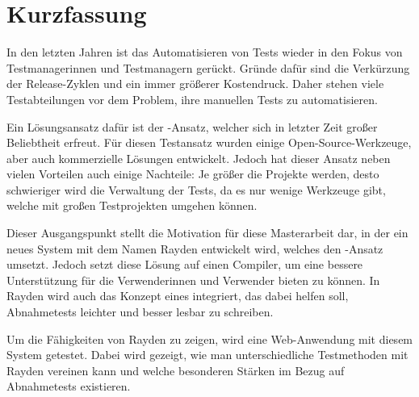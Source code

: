 \chapter{Kurzfassung}

In den letzten Jahren ist das Automatisieren von Tests wieder in den Fokus von Testmanagerinnen und Testmanagern gerückt. Gründe dafür sind die Verkürzung der Release-Zyklen und ein immer größerer Kostendruck. Daher stehen viele Testabteilungen vor dem Problem, ihre manuellen Tests zu automatisieren.

\SuperPar
Ein Lösungsansatz dafür ist der -Ansatz, welcher sich in letzter Zeit großer Beliebtheit erfreut. Für diesen Testansatz wurden einige Open-Source-Werkzeuge, aber auch kommerzielle Lösungen entwickelt. Jedoch hat dieser Ansatz neben vielen Vorteilen auch einige Nachteile: Je größer die Projekte werden, desto schwieriger wird die Verwaltung der Tests, da es nur wenige Werkzeuge gibt, welche mit großen Testprojekten umgehen können. 

\SuperPar
Dieser Ausgangspunkt stellt die Motivation für diese Masterarbeit dar, in der ein neues System mit dem Namen Rayden entwickelt wird, welches den -Ansatz umsetzt. Jedoch setzt diese Lösung auf einen Compiler, um eine bessere Unterstützung für die Verwenderinnen und Verwender bieten zu können. In Rayden wird auch das Konzept eines  integriert, das dabei helfen soll, Abnahmetests leichter und besser lesbar zu schreiben.

\SuperPar
Um die Fähigkeiten von Rayden zu zeigen, wird eine Web-Anwendung mit diesem System getestet. Dabei wird gezeigt, wie man unterschiedliche Testmethoden mit Rayden vereinen kann und welche besonderen Stärken im Bezug auf Abnahmetests existieren.